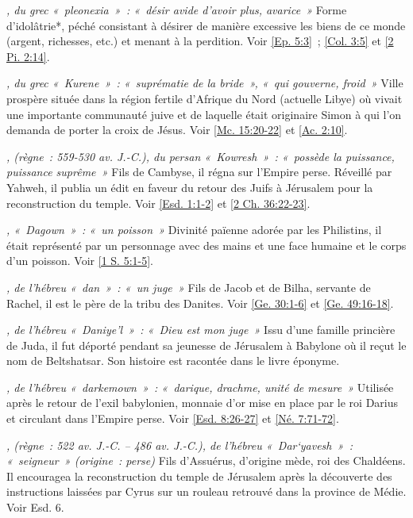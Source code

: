 \begin{multicols}{2}
\textit{, du grec «~pleonexia~»~: «~désir avide d'avoir plus, avarice~»}\newline
Forme d'idolâtrie*, péché consistant à désirer de manière excessive les biens de ce monde (argent, richesses, etc.) et menant à la perdition. Voir \vref{Ep. 5:3}~; \vref{Col. 3:5} et \vref{2 Pi. 2:14}.

\textit{, du grec «~Kurene~»~: «~suprématie de la bride~», «~qui gouverne, froid~»}\newline
Ville prospère située dans la région fertile d'Afrique du Nord (actuelle Libye) où vivait une importante communauté juive et de laquelle était originaire Simon à qui l'on demanda de porter la croix de Jésus. Voir \vref{Mc. 15:20-22} et \vref{Ac. 2:10}.

\textit{, (règne~: 559-530 av. J.-C.), du persan «~Kowresh~»~: «~possède la puissance, puissance suprême~»}\newline
Fils de Cambyse, il régna sur l'Empire perse. Réveillé par Yahweh, il publia un édit en faveur du retour des Juifs à Jérusalem pour la reconstruction du temple. Voir \vref{Esd. 1:1-2} et \vref{2 Ch. 36:22-23}.

\textit{, «~Dagown~»~: «~un poisson~»}\newline
Divinité païenne adorée par les Philistins, il était représenté par un personnage avec des mains et une face humaine et le corps d'un poisson. Voir \vref{1 S. 5:1-5}.

\textit{, de l'hébreu «~dan~»~: «~un juge~»}\newline
Fils de Jacob et de Bilha, servante de Rachel, il est le père de la tribu des Danites. Voir \vref{Ge. 30:1-6} et \vref{Ge. 49:16-18}.

\textit{, de l'hébreu «~Daniye'l~»~: «~Dieu est mon juge~»}\newline
Issu d'une famille princière de Juda, il fut déporté pendant sa jeunesse de Jérusalem à Babylone où il reçut le nom de Beltshatsar. Son histoire est racontée dans le livre éponyme.

\textit{, de l'hébreu «~darkemown~»~: «~darique, drachme, unité de mesure~»}\newline
Utilisée après le retour de l'exil babylonien, monnaie d'or mise en place par le roi Darius et circulant dans l'Empire perse. Voir \vref{Esd. 8:26-27} et \vref{Né. 7:71-72}.

\textit{, (règne~: 522 av. J.-C. – 486 av. J.-C.), de l'hébreu «~Dar`yavesh~»~: «~seigneur~» (origine~: perse)}\newline
Fils d'Assuérus, d'origine mède, roi des Chaldéens. Il encouragea la reconstruction du temple de Jérusalem après la découverte des instructions laissées par Cyrus sur un rouleau retrouvé dans la province de Médie. Voir Esd. 6.


\end{multicols}
